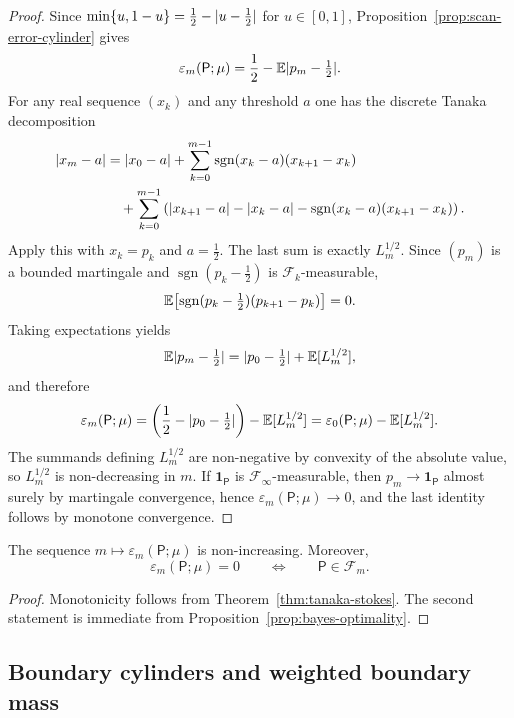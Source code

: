 \begin{proof}
Since \(\min\{u,1-u\}=\tfrac12-\lvert u-\tfrac12\rvert\) for \(u\in[0,1]\),
Proposition~\ref{prop:scan-error-cylinder} gives
\[
  \varepsilon_m(\mathsf{P};\mu)
  = \frac12 - \mathbb{E}\lvert p_m-\tfrac12\rvert.
\]
For any real sequence \((x_k)\) and any threshold \(a\) one has the
discrete Tanaka decomposition
\begin{align*}
  \lvert x_m-a\rvert
  &= \lvert x_0-a\rvert
     + \sum_{k=0}^{m-1}
       \operatorname{sgn}(x_k-a)(x_{k+1}-x_k) \\
  &\quad
     + \sum_{k=0}^{m-1}
       \left(
         \lvert x_{k+1}-a\rvert
         - \lvert x_k-a\rvert
         - \operatorname{sgn}(x_k-a)(x_{k+1}-x_k)
       \right).
\end{align*}
Apply this with \(x_k=p_k\) and \(a=\tfrac12\).  The last sum is
exactly \(L_m^{1/2}\).  Since \((p_m)\) is a bounded martingale and
\(\operatorname{sgn}(p_k-\tfrac12)\) is \(\mathcal{F}_k\)-measurable,
\[
  \mathbb{E}\!\left[
    \operatorname{sgn}(p_k-\tfrac12)(p_{k+1}-p_k)
  \right]
  = 0.
\]
Taking expectations yields
\[
  \mathbb{E}\lvert p_m-\tfrac12\rvert
  = \lvert p_0-\tfrac12\rvert + \mathbb{E}[L_m^{1/2}],
\]
and therefore
\[
  \varepsilon_m(\mathsf{P};\mu)
  = \left(\frac12-\lvert p_0-\tfrac12\rvert\right)
    - \mathbb{E}[L_m^{1/2}]
  = \varepsilon_0(\mathsf{P};\mu)-\mathbb{E}[L_m^{1/2}].
\]
The summands defining \(L_m^{1/2}\) are non-negative by convexity of the
absolute value, so \(L_m^{1/2}\) is non-decreasing in \(m\).  If
\(\mathbf{1}_{\mathsf{P}}\) is \(\mathcal{F}_\infty\)-measurable, then
\(p_m\to \mathbf{1}_{\mathsf{P}}\) almost surely by martingale
convergence, hence \(\varepsilon_m(\mathsf{P};\mu)\to 0\), and the last
identity follows by monotone convergence.
\end{proof}

\begin{corollary}\label{cor:clarity-monotone}
The sequence \(m\mapsto \varepsilon_m(\mathsf{P};\mu)\) is
non-increasing.  Moreover,
\[
  \varepsilon_m(\mathsf{P};\mu)=0
  \qquad\Longleftrightarrow\qquad
  \mathsf{P}\in\mathcal{F}_m.
\]
\end{corollary}

\begin{proof}
Monotonicity follows from Theorem~\ref{thm:tanaka-stokes}.  The second
statement is immediate from Proposition~\ref{prop:bayes-optimality}.
\end{proof}

\subsection{Boundary cylinders and weighted boundary mass}

